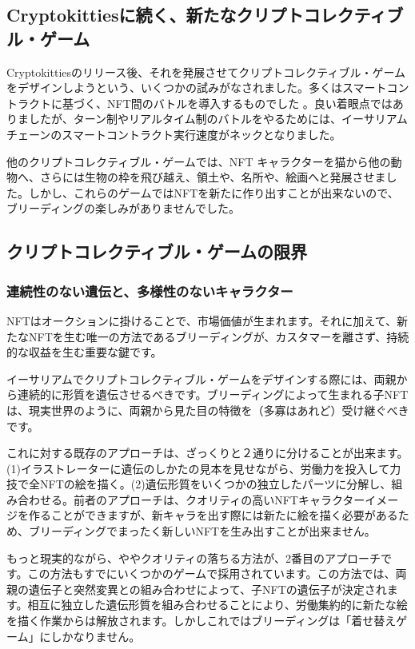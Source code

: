 \documentclass[a4paper]{article}
\begin{document}
\subsection{Cryptokittiesに続く、新たなクリプトコレクティブル・ゲーム}

Cryptokittiesのリリース後、それを発展させてクリプトコレクティブル・ゲームをデザインしようという、いくつかの試みがなされました。多くはスマートコントラクトに基づく、NFT間のバトルを導入するものでした\cite{cryptofighters,fishbank,cryptomons,etheremon} 。良い着眼点ではありましたが、ターン制やリアルタイム制のバトルをやるためには、イーサリアムチェーンのスマートコントラクト実行速度がネックとなりました。

他のクリプトコレクティブル・ゲームでは、NFT キャラクターを猫から他の動物へ、さらには生物の枠を飛び越え、領土や、名所や、絵画へと発展させました。しかし、これらのゲームではNFTを新たに作り出すことが出来ないので、ブリーディングの楽しみがありませんでした。

\subsection{クリプトコレクティブル・ゲームの限界}
\subsubsection{連続性のない遺伝と、多様性のないキャラクター}

NFTはオークションに掛けることで、市場価値が生まれます。それに加えて、新たなNFTを生む唯一の方法であるブリーディングが、カスタマーを離さず、持続的な収益を生む重要な鍵です。

イーサリアムでクリプトコレクティブル・ゲームをデザインする際には、両親から連続的に形質を遺伝させるべきです。ブリーディングによって生まれる子NFTは、現実世界のように、両親から見た目の特徴を（多寡はあれど）受け継ぐべきです。

これに対する既存のアプローチは、ざっくりと２通りに分けることが出来ます。(1)イラストレーターに遺伝のしかたの見本を見せながら、労働力を投入して力技で全NFTの絵を描く。(2)遺伝形質をいくつかの独立したパーツに分解し、組み合わせる。前者のアプローチは、クオリティの高いNFTキャラクターイメージを作ることができますが、新キャラを出す際には新たに絵を描く必要があるため、ブリーディングでまったく新しいNFTを生み出すことが出来ません。

もっと現実的ながら、ややクオリティの落ちる方法が、2番目のアプローチです。この方法もすでにいくつかのゲームで採用されています。この方法では、両親の遺伝子と突然変異との組み合わせによって、子NFTの遺伝子が決定されます。相互に独立した遺伝形質を組み合わせることにより、労働集約的に新たな絵を描く作業からは解放されます\cite{cryptokitties,etherwaifu,cryptofighters}。しかしこれではブリーディングは「着せ替えゲーム」にしかなりません。
\end{document}
